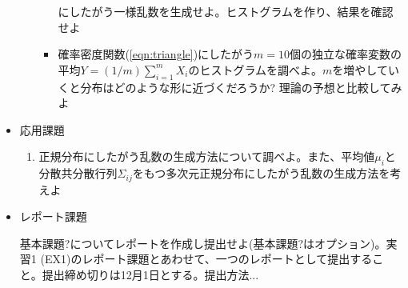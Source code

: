 \documentclass[11pt]{jarticle}
\begin{document}
\begin{itemize}
\begin{enumerate}
\begin{itemize}
\begin{equation}
        \label{eqn:triangle}
      \end{equation}
      にしたがう一様乱数を生成せよ。ヒストグラムを作り、結果を確認せよ
    \item 確率密度関数(\ref{eqn:triangle})にしたがう$m=10$個の独立な確率変数の平均$Y=(1/m) \sum_{i=1}^m X_i$のヒストグラムを調べよ。$m$を増やしていくと分布はどのような形に近づくだろうか? 理論の予想と比較してみよ
    \end{itemize}
  \end{enumerate}  
\item 応用課題
  \begin{enumerate}
  \item 正規分布にしたがう乱数の生成方法について調べよ。また、平均値$\mu_i$と分散共分散行列$\Sigma_{ij}$をもつ多次元正規分布にしたがう乱数の生成方法を考えよ
  \end{enumerate}

\item レポート課題

  基本課題?についてレポートを作成し提出せよ(基本課題?はオプション)。実習1 (EX1)のレポート課題とあわせて、一つのレポートとして提出すること。提出締め切りは12月1日とする。提出方法...
  
\end{itemize}
\end{document}
